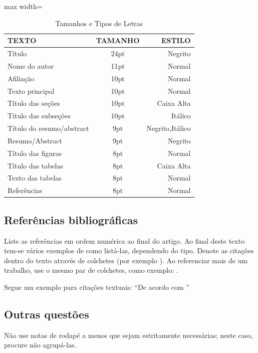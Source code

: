 \begin{table}[h]
\centering
\caption{Tamanhos e Tipos de Letras}
\label{tab:tabela1}
\begin{adjustbox}{max width=\textwidth}
\begin{tabular}{lcr}
\hline
TEXTO                     & TAMANHO & ESTILO          \\ \hline
Título                    & 24pt    & Negrito         \\
Nome do autor             & 11pt    & Normal          \\
Afiliação                 & 10pt    & Normal          \\
Texto principal           & 10pt    & Normal          \\
Título das seções         & 10pt    & Caixa Alta      \\
Título das subseções      & 10pt    & Itálico         \\
Título do resumo/abstract & 9pt     & Negrito,Itálico \\
Resumo/Abstract           & 9pt     & Negrito         \\
Título das figuras        & 8pt     & Normal          \\
Título das tabelas        & 8pt     & Caixa Alta      \\
Texto das tabelas         & 8pt     & Normal          \\
Referências               & 8pt     & Normal          \\ \hline
\end{tabular}
\end{adjustbox}
\end{table}




\subsection{Referências bibliográficas}

Liste as referências em ordem numérica ao final do artigo. Ao final deste texto tem-se vários exemplos de como listá-las, dependendo do tipo. Denote as citações dentro do texto através de colchetes (por exemplo \cite{LIMA2018}). Ao referenciar mais de um trabalho, use o mesmo par de colchetes, como exemplo: \cite{LUCKMANN2008,livro-unoesc,NR10,abntex2modelo}. 

Segue um exemplo para citações textuais: ``De acordo com \textcite{CHAPMAN2013}'' 

\subsection{Outras questões}
Não use notas de rodapé a menos que sejam estritamente necessárias; neste caso, procure não agrupá-las. 
